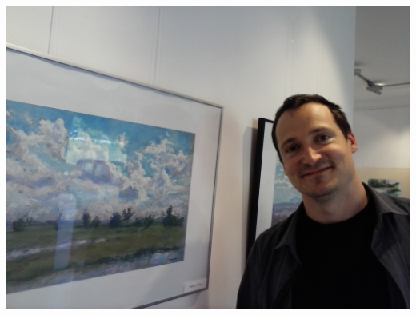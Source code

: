 \documentclass[a4paper,twoside, svgnames]{article}
\begin{document}
\begin{multicols}{2}
\begin{onehalfspacing}
\begin{justify}
\begin{center}
\includegraphics[width=\linewidth]{images/CAM04603}
\end{center}



        \end{justify}
     \end{onehalfspacing}
\end{multicols}

\newpage
{}
\begin{minipage}[b]{0.5\linewidth}

\end{minipage}
\newpage

\begin{minipage}[b]{0.5\linewidth}

\end{minipage}
\newpage

\begin{minipage}[b]{0.5\linewidth}

\end{minipage}
\newpage
\end{document}
